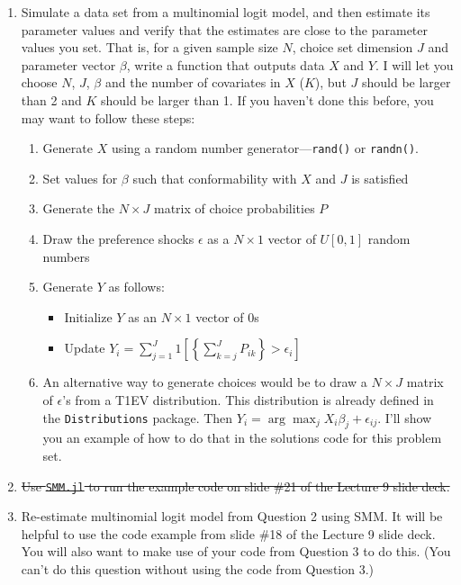 \documentclass[12pt,english]{article}
\begin{document}
\begin{enumerate}
\item Simulate a data set from a multinomial logit model, and then estimate its parameter values and verify that the estimates are close to the parameter values you set. That is, for a given sample size $N$, choice set dimension $J$ and parameter vector $\beta$, write a function that outputs data $X$ and $Y$. I will let you choose $N$, $J$, $\beta$ and the number of covariates in $X$ ($K$), but $J$ should be larger than 2 and $K$ should be larger than 1. If you haven't done this before, you may want to follow these steps:
    \begin{enumerate}
    \item Generate $X$ using a random number generator---\texttt{rand()} or \texttt{randn()}.
    \item Set values for $\beta$ such that conformability with $X$ and $J$ is satisfied
    \item Generate the $N\times J$ matrix of choice probabilities $P$
    \item Draw the preference shocks $\epsilon$ as a $N\times 1$ vector of $U[0,1]$ random numbers
    \item Generate $Y$ as follows:
        \begin{itemize}
        \item Initialize $Y$ as an $N\times 1$ vector of 0s
        \item Update $Y_i = \sum_{j=1}^J 1\left[\left\{\sum_{k=j}^J  P_{ik}\right\} > 
        \epsilon_i\right]$
        \end{itemize}
    \item An alternative way to generate choices would be to draw a $N\times J$ matrix of $\epsilon$'s from a T1EV distribution. This distribution is already defined in the \texttt{Distributions} package. Then $Y_i = \arg \max_{j} X_i \beta_j + \epsilon_{ij}$. I'll show you an example of how to do that in the solutions code for this problem set.
    \end{enumerate}
\item \sout{Use \texttt{SMM.jl} to run the example code on slide \#21 of the Lecture 9 slide deck.}

\item Re-estimate multinomial logit model from Question 2 using SMM. It will be helpful to use the code example from slide \#18 of the Lecture 9 slide deck. You will also want to make use of your code from Question 3 to do this. (You can't do this question without using the code from Question 3.)


\end{enumerate}
\end{document}
